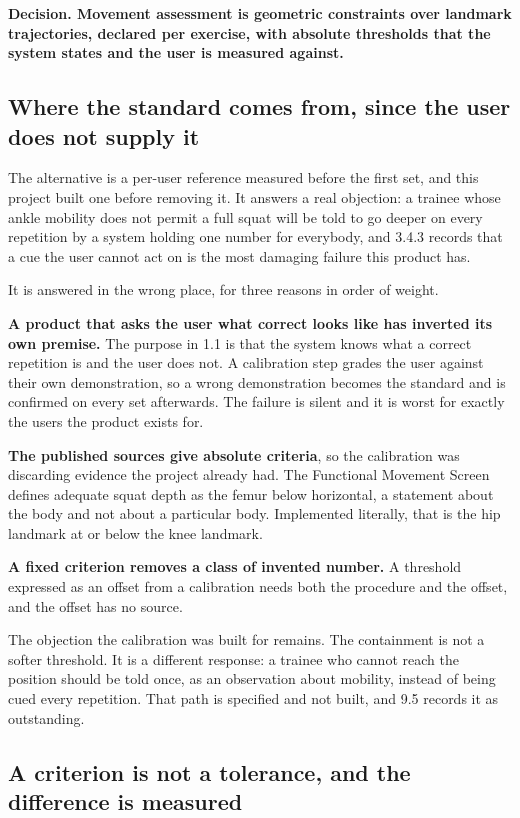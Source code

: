 \textbf{Decision. Movement assessment is geometric constraints over landmark trajectories, declared per exercise, with absolute thresholds that the system states and the user is measured against.}

\subsection{Where the standard comes from, since the user does not supply it}
\label{sec:4.5.1}

The alternative is a per-user reference measured before the first set, and this project built one before removing it. It answers a real objection: a trainee whose ankle mobility does not permit a full squat will be told to go deeper on every repetition by a system holding one number for everybody, and 3.4.3 records that a cue the user cannot act on is the most damaging failure this product has.

It is answered in the wrong place, for three reasons in order of weight.

\textbf{A product that asks the user what correct looks like has inverted its own premise.} The purpose in 1.1 is that the system knows what a correct repetition is and the user does not. A calibration step grades the user against their own demonstration, so a wrong demonstration becomes the standard and is confirmed on every set afterwards. The failure is silent and it is worst for exactly the users the product exists for.

\textbf{The published sources give absolute criteria}, so the calibration was discarding evidence the project already had. The Functional Movement Screen defines adequate squat depth as the femur below horizontal, a statement about the body and not about a particular body. Implemented literally, that is the hip landmark at or below the knee landmark.

\textbf{A fixed criterion removes a class of invented number.} A threshold expressed as an offset from a calibration needs both the procedure and the offset, and the offset has no source.

The objection the calibration was built for remains. The containment is not a softer threshold. It is a different response: a trainee who cannot reach the position should be told once, as an observation about mobility, instead of being cued every repetition. That path is specified and not built, and 9.5 records it as outstanding.

\subsection{A criterion is not a tolerance, and the difference is measured}
\label{sec:4.5.2}

